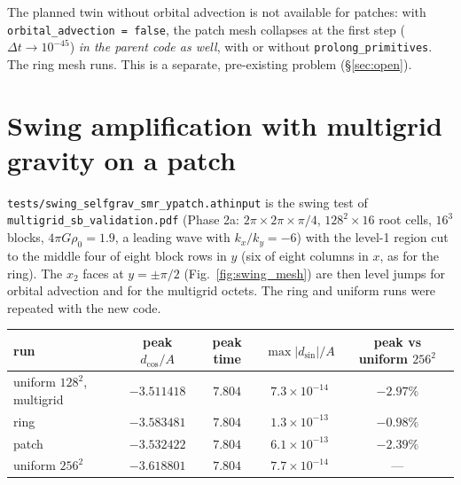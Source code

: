 \documentclass[11pt]{article}
\newcommand{\code}[1]{\texttt{#1}}
\newcommand{\file}[1]{\texttt{\small #1}}
\begin{document}
The planned twin without orbital advection is not available for patches: with
\code{orbital\_advection = false}, the patch mesh collapses at the first step
($\Delta t \to 10^{-45}$) \emph{in the parent code as well}, with or without
\code{prolong\_primitives}. The ring mesh runs. This is a separate, pre-existing problem
(\S\ref{sec:open}).

\section{Swing amplification with multigrid gravity on a patch}
\label{sec:swing}
\file{tests/swing\_selfgrav\_smr\_ypatch.athinput} is the swing test of
\file{multigrid\_sb\_validation.pdf} (Phase 2a: $2\pi\times2\pi\times\pi/4$,
$128^2\times16$ root cells, $16^3$ blocks, $4\pi G\rho_0 = 1.9$, a leading wave with
$k_x/k_y = -6$) with the level-1 region cut to the middle four of eight block rows in $y$
(six of eight columns in $x$, as for the ring). The $x_2$ faces at $y = \pm\pi/2$ (Fig.~\ref{fig:swing_mesh}) are then
level jumps for orbital advection and for the multigrid octets. The ring and uniform runs
were repeated with the new code.

\begin{center}
\small
\begin{tabular}{@{}lcccc@{}}
\toprule
run & peak $d_{\cos}/A$ & peak time & $\max|d_{\sin}|/A$ & peak vs uniform $256^2$ \\
\midrule
uniform $128^2$, multigrid & $-3.511418$ & $7.804$ & $7.3\times10^{-14}$ & $-2.97\%$ \\
ring                      & $-3.583481$ & $7.804$ & $1.3\times10^{-13}$ & $-0.98\%$ \\
patch                     & $-3.532422$ & $7.804$ & $6.1\times10^{-13}$ & $-2.39\%$ \\
uniform $256^2$           & $-3.618801$ & $7.804$ & $7.7\times10^{-14}$ & --- \\
\bottomrule
\end{tabular}
\end{center}
\end{document}
